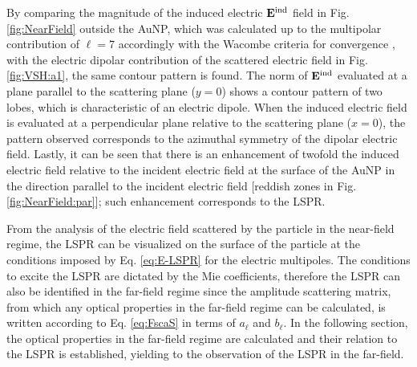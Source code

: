 By comparing the magnitude of the induced electric $\vb{E}^\text{ind}$ field in Fig. \ref{fig:NearField} outside the AuNP, which was calculated up to  the multipolar contribution of $\ell = 7$ accordingly with the Wacombe criteria for convergence \cite{bohren_absorption_1983}, with the electric dipolar contribution of the scattered electric field in Fig. \ref{fig:VSH:a1}, the same contour pattern is found. The norm of $\vb{E}^\text{ind}$ evaluated at a plane parallel to the scattering plane ($y=0$) shows a contour pattern of two lobes, which is characteristic of an electric dipole. When the induced electric field is evaluated at a perpendicular plane relative to the scattering plane ($x = 0$), the pattern observed corresponds to the azimuthal symmetry of the dipolar electric field. Lastly, it can be seen that there is an enhancement of  twofold the induced electric field relative to the incident electric field at the surface of the AuNP in the direction parallel to the incident  electric field  [reddish zones in Fig. \ref{fig:NearField:par}]; such enhancement corresponds to the LSPR.

From the analysis of the electric field scattered by the particle in the near-field regime, the LSPR can be visualized on the surface of the particle at the conditions imposed by Eq. \eqref{eq:E-LSPR}  for the electric multipoles. The conditions to excite the LSPR are dictated by the Mie coefficients, therefore the LSPR can also be identified in the far-field regime since the amplitude scattering matrix, from which  any optical properties in the far-field regime can be calculated, is written according to Eq. \eqref{eq:FscaS} in terms of $a_\ell$ and $b_\ell$. In the following section, the optical properties in the far-field regime are calculated and their relation to the LSPR is established, yielding to the observation of the LSPR in the far-field.
